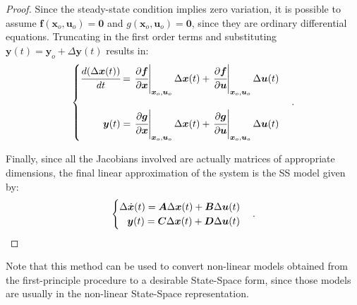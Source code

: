 \documentclass[a4paper,11pt]{book}
\numberwithin{figure}{chapter}
\numberwithin{equation}{chapter}
\numberwithin{table}{chapter}
\theoremstyle{definition}
\begin{document}
\begin{proof}
    Since the steady-state condition implies zero variation, it is possible to assume $\bm{f}(\bm{x}_o, \bm{u}_o) = \bm{0}$ and $g(\bm{x}_o, \bm{u}_o) = \bm{0}$, since they are ordinary differential equations. Truncating in the first order terms and substituting $\bm{y}(t) = \bm{y}_o + \Delta \bm{y}(t)$ results in:
    \begin{align}
    \begin{cases}
        \cfrac{d(\Delta \bm{x}(t))}{dt} =\left. \cfrac{\partial \bm{f}}{\partial \bm{x}}\right\vert_{\bm{x}_o, \bm{u}_o} \Delta \bm{x}(t) + \left. \cfrac{\partial \bm{f}}{\partial \bm{u}}\right\vert_{\bm{x}_o,  \bm{u}_o}  \Delta \bm{u}(t) \\ \\
        \hfill \bm{y}(t) = \left. \cfrac{\partial \bm{g}}{\partial \bm{x}}\right\vert_{\bm{x}_o, \bm{u}_o} \Delta \bm{x}(t) + \left. \cfrac{\partial \bm{g}}{\partial \bm{u}}\right\vert_{\bm{x}_o, \bm{u}_o} \Delta \bm{u}(t) \\
    \end{cases}
    .\end{align}
    
    Finally, since all the Jacobians involved are actually matrices of appropriate dimensions, the final linear approximation of the system is the SS model given by:
    \begin{align}
    \begin{cases}
        \Delta \dot{\bm{x}}(t) = \bm{A}\Delta \bm{x}(t) + \bm{B}\Delta \bm{u}(t) & \\
        \hfill \bm{y}(t) = \bm{C}\Delta \bm{x}(t) + \bm{D}\Delta \bm{u}(t) &
    \end{cases}
    .\end{align}
\end{proof}

Note that this method can be used to convert non-linear models obtained from the first-principle procedure to a desirable State-Space form, since those models are usually in the non-linear State-Space representation. 
\end{document}
